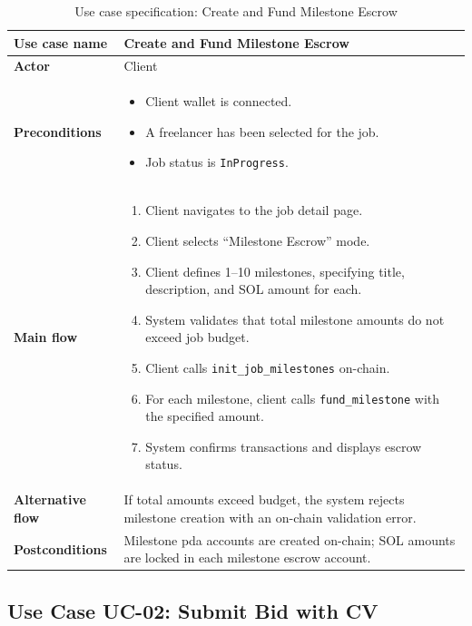 \begin{table}[H]
\centering
\caption{Use case specification: Create and Fund Milestone Escrow}
\label{table:uc01}
\begin{tabular}{|l|p{10cm}|}
\hline
\textbf{Use case name} & Create and Fund Milestone Escrow \\ \hline
\textbf{Actor} & Client \\ \hline
\textbf{Preconditions} & \begin{itemize}[noitemsep]
    \item Client wallet is connected.
    \item A freelancer has been selected for the job.
    \item Job status is \texttt{InProgress}.
\end{itemize} \\ \hline
\textbf{Main flow} & \begin{enumerate}[noitemsep]
    \item Client navigates to the job detail page.
    \item Client selects ``Milestone Escrow'' mode.
    \item Client defines 1--10 milestones, specifying title, description, and SOL amount for each.
    \item System validates that total milestone amounts do not exceed job budget.
    \item Client calls \texttt{init\_job\_milestones} on-chain.
    \item For each milestone, client calls \texttt{fund\_milestone} with the specified amount.
    \item System confirms transactions and displays escrow status.
\end{enumerate} \\ \hline
\textbf{Alternative flow} & If total amounts exceed budget, the system rejects milestone creation with an on-chain validation error. \\ \hline
\textbf{Postconditions} & Milestone \gls{pda} accounts are created on-chain; SOL amounts are locked in each milestone escrow account. \\ \hline
\end{tabular}
\end{table}

\subsection{Use Case UC-02: Submit Bid with CV}
\label{subsection:uc02}

